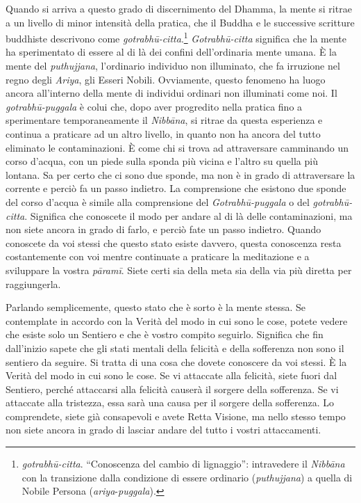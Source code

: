 Quando si arriva a questo grado di discernimento del Dhamma, la mente si
ritrae a un livello di minor intensità della pratica, che il Buddha e le
successive scritture buddhiste descrivono come
\emph{gotrabhū-citta}.\footnote{\emph{gotrabhū-citta}. ``Conoscenza del
  cambio di lignaggio'': intravedere il \emph{Nibbāna} con la
  transizione dalla condizione di essere ordinario (\emph{puthujjana}) a
  quella di Nobile Persona (\emph{ariya}-\emph{puggala}).}
\emph{Gotrabhū-citta} significa che la mente ha sperimentato di essere
al di là dei confini dell'ordinaria mente umana. È la mente del
\emph{puthujjana}, l'ordinario individuo non illuminato, che fa
irruzione nel regno degli \emph{Ariya}, gli Esseri Nobili. Ovviamente,
questo fenomeno ha luogo ancora all'interno della mente di individui
ordinari non illuminati come noi. Il \emph{gotrabhū-puggala} è colui
che, dopo aver progredito nella pratica fino a sperimentare
temporaneamente il \emph{Nibbāna}, si ritrae da questa esperienza e
continua a praticare ad un altro livello, in quanto non ha ancora del
tutto eliminato le contaminazioni. È come chi si trova ad attraversare
camminando un corso d'acqua, con un piede sulla sponda più vicina e
l'altro su quella più lontana. Sa per certo che ci sono due sponde, ma
non è in grado di attraversare la corrente e perciò fa un passo
indietro. La comprensione che esistono due sponde del corso d'acqua è
simile alla comprensione del \emph{Gotrabhū-puggala} o del
\emph{gotrabhū-citta}. Significa che conoscete il modo per andare al di
là delle contaminazioni, ma non siete ancora in grado di farlo, e perciò
fate un passo indietro. Quando conoscete da voi stessi che questo stato
esiste davvero, questa conoscenza resta costantemente con voi mentre
continuate a praticare la meditazione e a sviluppare la vostra
\emph{pāramī}. Siete certi sia della meta sia della via più diretta per
raggiungerla.

Parlando semplicemente, questo stato che è sorto è la mente stessa. Se
contemplate in accordo con la Verità del modo in cui sono le cose,
potete vedere che esiste solo un Sentiero e che è vostro compito
seguirlo. Significa che fin dall'inizio sapete che gli stati mentali
della felicità e della sofferenza non sono il sentiero da seguire. Si
tratta di una cosa che dovete conoscere da voi stessi. È la Verità del
modo in cui sono le cose. Se vi attaccate alla felicità, siete fuori dal
Sentiero, perché attaccarsi alla felicità causerà il sorgere della
sofferenza. Se vi attaccate alla tristezza, essa sarà una causa per il
sorgere della sofferenza. Lo comprendete, siete già consapevoli e avete
Retta Visione, ma nello stesso tempo non siete ancora in grado di
lasciar andare del tutto i vostri attaccamenti.

